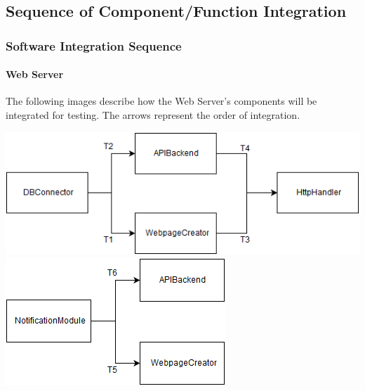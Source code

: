 \documentclass{article}
\begin{document}
\subsection{Sequence of Component/Function Integration}
\subsubsection{Software Integration Sequence}
\paragraph{Web Server}
The following images describe how the Web Server's 
components will be integrated for testing.
The arrows represent the order of integration.
\begin{center}
	\includegraphics{WebServer1}
	\includegraphics{WebServer2}
\end{center}
\end{document}
